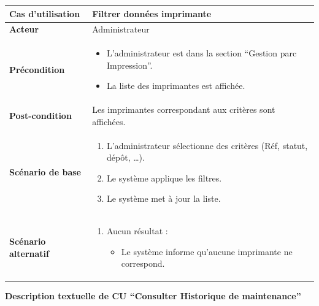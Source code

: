 \documentclass[a4paper,11pt]{report}
\begin{document}
\begin{tabularx}{\textwidth}{|>{\bfseries}l|X|}
  \hline
  Cas d’utilisation    & Filtrer données imprimante \\ \hline
  Acteur               & Administrateur \\ \hline
  Précondition         &
    \begin{itemize}[left=0pt]
      \item L’administrateur est dans la section ``Gestion parc Impression''.
      \item La liste des imprimantes est affichée.
    \end{itemize} \\ \hline
  Post-condition       & Les imprimantes correspondant aux critères sont affichées. \\ \hline
  Scénario de base     &
    \begin{enumerate}[left=0pt]
      \item L’administrateur sélectionne des critères (Réf, statut, dépôt, …).
      \item Le système applique les filtres.
      \item Le système met à jour la liste.
    \end{enumerate} \\ \hline
  Scénario alternatif   &
    \begin{enumerate}[label=\arabic*.a,wide=0pt]
      \item[3.a] Aucun résultat :
        \begin{itemize}[left=1em]
          \item Le système informe qu’aucune imprimante ne correspond.
        \end{itemize}
    \end{enumerate} \\ \hline
\end{tabularx}

\vspace{1.5em}

\textbf{Description textuelle de CU ``Consulter Historique de maintenance''}
\end{document}
